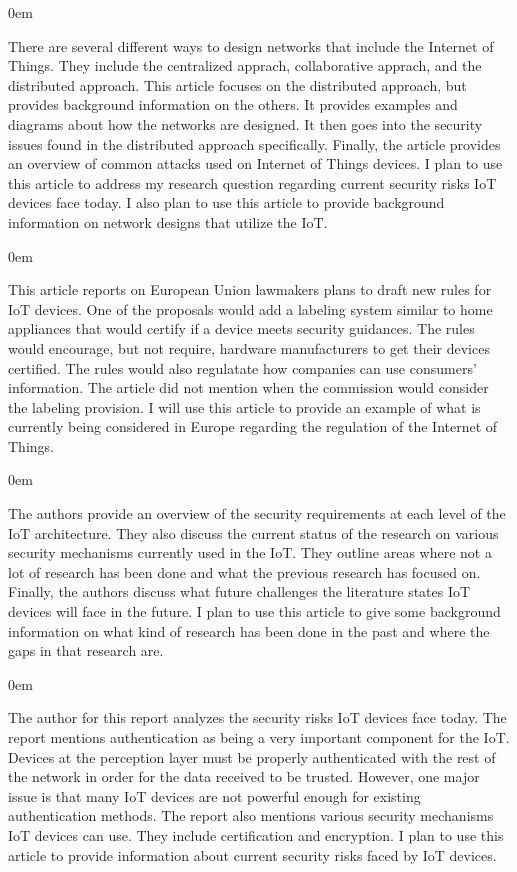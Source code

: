\documentclass{article}
\newenvironment{annotation}{\begin{addmargin}[2.5em]{0em} \begin{flushleft}}{\end{flushleft} \end{addmargin}}
\begin{document}
\begin{annotation}
There are several different ways to design networks that include the Internet of Things. They include the centralized apprach, collaborative apprach, and the distributed approach. This article focuses on the
distributed approach, but provides background information on the others. It provides examples and diagrams about how the networks are designed. It then goes into the security issues found in the distributed
approach specifically. Finally, the article provides an overview of common attacks used on Internet of Things devices. I plan to use this article to address my research question regarding current security
risks IoT devices face today. I also plan to use this article to provide background information on network designs that utilize the IoT. 
\end{annotation}

\begin{annotation}
This article reports on European Union lawmakers plans to draft new rules for IoT devices. One of the proposals would add a labeling system similar to home appliances that would
certify if a device meets security guidances. The rules would encourage, but not require, hardware manufacturers to get their devices certified. The rules would also regulatate how companies 
can use consumers' information. The article did not mention when the commission would consider the labeling provision. I will use this article to provide an example of what is currently being considered in Europe regarding the regulation of the Internet of Things. 
\end{annotation}

\begin{annotation}
The authors provide an overview of the security requirements at each level of the IoT architecture. They also discuss the current status of the research on various security mechanisms currently used
in the IoT. They outline areas where not a lot of research has been done and what the previous research has focused on. Finally, the authors discuss what future challenges the literature states
IoT devices will face in the future. I plan to use this article to give some background information on what kind of research has been done in the past and where the gaps in that research are. 
\end{annotation}

\begin{annotation}
The author for this report analyzes the security risks IoT devices face today. The report mentions authentication as being a very important component for the IoT. Devices at the perception layer must be
properly authenticated with the rest of the network in order for the data received to be trusted. However, one major issue is that many IoT devices are not powerful enough for existing authentication methods.
The report also mentions various security mechanisms IoT devices can use. They include certification and encryption. I plan to use this article to provide information about current security risks
faced by IoT devices.
\end{annotation}
\end{document}
